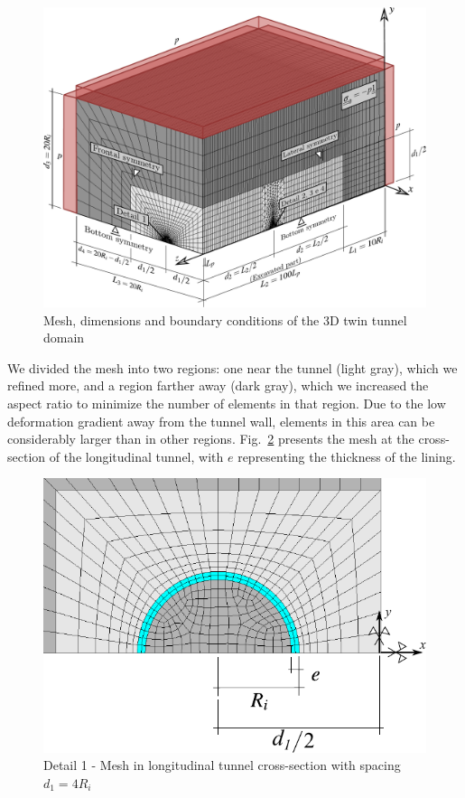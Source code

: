 \documentclass[a4paper,fleqn]{cas-sc}
\begin{document}
\begin{figure}[h!]
	\centering
	\includegraphics[scale=0.5]{Mesh1.pdf}
	\caption{Mesh, dimensions and boundary conditions of the 3D twin tunnel domain}
	\label{Mesh1}
\end{figure}
We divided the mesh into two regions: one near the tunnel (light gray), which we refined more, and a region farther away (dark gray), which we increased the aspect ratio to minimize the number of elements in that region. Due to the low deformation gradient away from the tunnel wall, elements in this area can be considerably larger than in other regions. Fig.~\ref{Mesh2} presents the mesh at the cross-section of the longitudinal tunnel, with $e$ representing the thickness of the lining.
\begin{figure}[h!]
	\centering
	\includegraphics[scale=0.8]{Mesh2.pdf}
	\caption{Detail 1 - Mesh in longitudinal tunnel cross-section with spacing $d_1=4R_i$}
	\label{Mesh2}
\end{figure}
\end{document}
